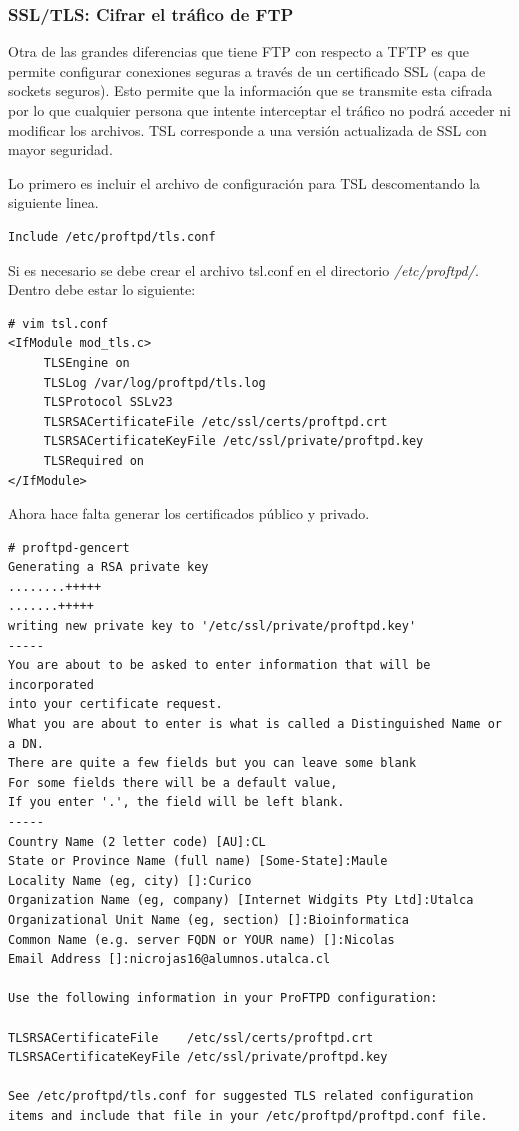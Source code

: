 \documentclass[12pt]{article}
\begin{document}
\subsubsection{SSL/TLS: Cifrar el tráfico de FTP}

Otra de las grandes diferencias que tiene FTP con respecto a TFTP es que permite configurar conexiones seguras a través de un certificado  SSL (capa de sockets seguros). Esto permite que la información que se transmite esta cifrada por lo que cualquier persona que intente interceptar el tráfico no podrá acceder ni modificar los archivos. TSL corresponde a una versión actualizada de SSL con mayor seguridad. 

Lo primero es incluir el archivo de configuración para TSL descomentando la siguiente linea.
\begin{lstlisting}[frame=single]
Include /etc/proftpd/tls.conf
\end{lstlisting}

Si es necesario se debe crear el archivo tsl.conf en el directorio \emph{/etc/proftpd/}. Dentro debe estar lo siguiente:
\begin{lstlisting}[frame=single]
# vim tsl.conf
<IfModule mod_tls.c>
     TLSEngine on
     TLSLog /var/log/proftpd/tls.log
     TLSProtocol SSLv23
     TLSRSACertificateFile /etc/ssl/certs/proftpd.crt
     TLSRSACertificateKeyFile /etc/ssl/private/proftpd.key
     TLSRequired on
</IfModule>
\end{lstlisting}
\break
\break
\break
\break
Ahora hace falta generar los certificados público y privado.
\begin{lstlisting}[frame=single]
# proftpd-gencert
Generating a RSA private key
........+++++
.......+++++
writing new private key to '/etc/ssl/private/proftpd.key'
-----
You are about to be asked to enter information that will be incorporated
into your certificate request.
What you are about to enter is what is called a Distinguished Name or a DN.
There are quite a few fields but you can leave some blank
For some fields there will be a default value,
If you enter '.', the field will be left blank.
-----
Country Name (2 letter code) [AU]:CL
State or Province Name (full name) [Some-State]:Maule
Locality Name (eg, city) []:Curico
Organization Name (eg, company) [Internet Widgits Pty Ltd]:Utalca
Organizational Unit Name (eg, section) []:Bioinformatica
Common Name (e.g. server FQDN or YOUR name) []:Nicolas
Email Address []:nicrojas16@alumnos.utalca.cl

Use the following information in your ProFTPD configuration:

TLSRSACertificateFile    /etc/ssl/certs/proftpd.crt
TLSRSACertificateKeyFile /etc/ssl/private/proftpd.key

See /etc/proftpd/tls.conf for suggested TLS related configuration
items and include that file in your /etc/proftpd/proftpd.conf file.
\end{lstlisting}
\end{document}
